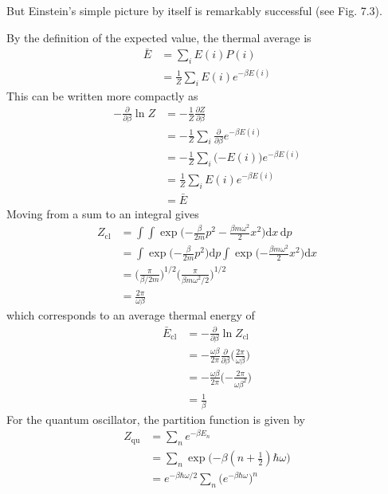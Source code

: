 \documentclass[../principles-of-quantum-mechanics.tex]{subfiles}
\begin{document}
\begin{questions}
		But Einstein's simple picture by itself is remarkably successful (see Fig. 7.3).
		\begin{solution}
			By the definition of the expected value, the thermal average is
			\begin{align*}
				\bar{E} &= \sum_iE(i)P(i) \\
				&= \frac{1}{Z}\sum_iE(i)e^{-\beta E(i)}
			\end{align*}
			This can be written more compactly as
			\begin{align*}
				{-\frac{\partial}{\partial \beta}} \ln Z &= -\frac{1}{Z}\frac{\partial Z}{\partial \beta} \\
				&= -\frac{1}{Z}\sum_i \frac{\partial}{\partial\beta}e^{-\beta E(i)} \\
				&= -\frac{1}{Z}\sum_i \big({-E(i)}\big)e^{-\beta E(i)} \\
				&= \frac{1}{Z}\sum_i E(i)e^{-\beta E(i)} \\
				&= \bar{E}
			\end{align*}
			Moving from a sum to an integral gives
			\begin{align*}
				Z_{\text{cl}} &= \int\!\!\!\!\int\exp\Big({-\frac{\beta}{2m}}p^2 - \frac{\beta m\omega^2}{2}x^2\Big)\mathrm{d}x\,\mathrm{d}p \\
				&= \int\exp\Big({-\frac{\beta}{2m}}p^2\Big)\mathrm{d}p\int\exp\Big({-\frac{\beta m\omega^2}{2}}x^2\Big)\mathrm{d}x \\
				&= \Big(\frac{\pi}{\beta/2m}\Big)^{1/2}\Big(\frac{\pi}{\beta m \omega^2/2}\Big)^{1/2} \\
				&= \frac{2\pi}{\omega\beta}
			\end{align*}
			which corresponds to an average thermal energy of
			\begin{align*}
				\bar{E}_{\text{cl}} &= {-\frac{\partial}{\partial\beta}}\ln Z_{\text{cl}} \\
				&= {-\frac{\omega \beta}{2\pi}}\frac{\partial}{\partial \beta}\Big(\frac{2\pi}{\omega\beta}\Big) \\
				&= {-\frac{\omega\beta}{2\pi}}\Big({-\frac{2\pi}{\omega\beta^2}}\Big) \\
				&= \frac{1}{\beta}
			\end{align*}
			For the quantum oscillator, the partition function is given by
			\begin{align*}
				Z_{\text{qu}} &= \sum_ne^{-\beta E_n} \\
				&= \sum_n \exp\Big({-\beta}(n + \tfrac{1}{2})\hbar\omega\Big) \\
				&= e^{-\beta\hbar\omega/2}\sum_n \big(e^{-\beta\hbar\omega}\big)^n \\

\end{align*}
\end{solution}
\end{questions}
\end{document}
